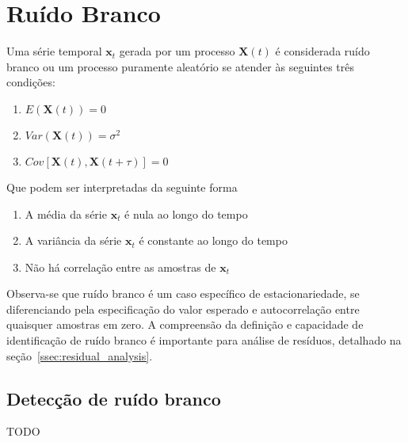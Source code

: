 \section{Ruído Branco}\label{sec:white_noise}

Uma série temporal $\mathbf{x}_t$ gerada por um processo $\mathbf{X}(t)$ é
considerada ruído branco ou um processo puramente aleatório se atender às
seguintes três condições:

\begin{enumerate}
    \item $E(\mathbf{X}(t)) = 0$
    \item $Var(\mathbf{X}(t)) = \sigma^2$
    \item $Cov[\mathbf{X}(t), \mathbf{X}(t+\tau)] = 0$
\end{enumerate}\vspace{.5cm}

Que podem ser interpretadas da seguinte forma

\begin{enumerate}
    \item A média da série $\mathbf{x}_t$ é nula ao longo do tempo
    \item A variância da série $\mathbf{x}_t$ é constante ao longo do tempo
    \item Não há correlação entre as amostras de $\mathbf{x}_t$
\end{enumerate}\vspace{.5cm}

Observa-se que ruído branco é um caso específico de estacionariedade, se
diferenciando pela especificação do valor esperado e autocorrelação entre
quaisquer amostras em zero. A compreensão da definição e capacidade de
identificação de ruído branco é importante para análise de resíduos, detalhado
na seção~\ref{ssec:residual_analysis}.

\subsection{Detecção de ruído branco}

TODO

